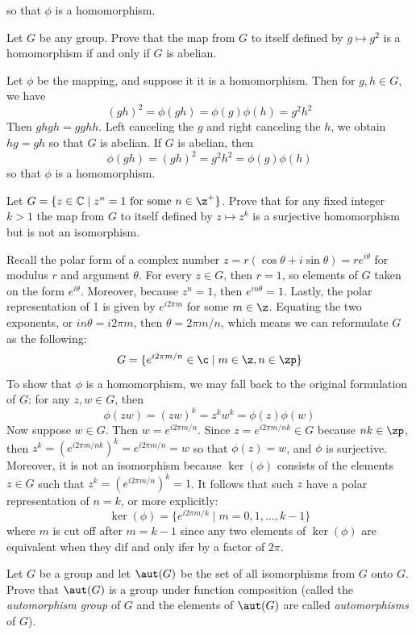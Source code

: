 \begin{problems}
\begin{sol}
        so that $\phi$ is a homomorphism.
    \end{sol}
    \item Let $G$ be any group. Prove that the map from $G$ to itself defined by $g \mapsto g^2$ is a homomorphism if and only if $G$ is abelian.
    \begin{sol}
        Let $\phi$ be the mapping, and suppose it it is a homomorphism. Then for $g, h \in G$, we have
        \[(gh)^2 = \phi(gh) = \phi(g)\phi(h) = g^2h^2\]
        Then $ghgh = gghh$. Left canceling the $g$ and right canceling the $h$, we obtain $hg = gh$ so that $G$ is abelian. If $G$ is abelian, then
        \[\phi(gh) = (gh)^2 = g^2h^2 = \phi(g)\phi(h)\]
        so that $\phi$ is a homomorphism.
    \end{sol}
    \item Let $G = \{ z \in \mathbb{C} \mid z^n = 1 \text{ for some } n \in \z^+ \}$. Prove that for any fixed integer $k > 1$ the map from $G$ to itself defined by $z \mapsto z^k$ is a surjective homomorphism but is not an isomorphism.
    \begin{sol}
        Recall the polar form of a complex number $z = r(\cos\theta + i\sin\theta) = re^{i\theta}$ for modulus $r$ and argument $\theta$. For every $z \in G$, then $r = 1$, so elements of $G$ taken on the form $e^{i\theta}$. Moreover, because $z^n = 1$, then $e^{in\theta} = 1$. Lastly, the polar representation of 1 is given by $e^{i2\pi m}$ for some $m \in \z$. Equating the two exponents, or $in\theta = i2\pi m$, then $\theta = 2\pi m/n$, which means we can reformulate $G$ as the following:
        \[G = \{e^{i2\pi m/n} \in \c \mid m \in \z, n \in \zp\}\]
        To show that $\phi$ is a homomorphism, we may fall back to the original formulation of $G$: for any $z, w \in G$, then
        \[\phi(zw) = (zw)^k = z^kw^k = \phi(z)\phi(w)\]
        Now suppose $w \in G$. Then $w = e^{i2\pi m/n}$. Since $z = e^{i2\pi m/nk} \in G$ because $nk \in \zp$, then $z^k = (e^{i2\pi m/nk})^k = e^{i2\pi m/n} = w$ so that $\phi(z) = w$, and $\phi$ is surjective. Moreover, it is not an isomorphism because $\ker(\phi)$ consists of the elements $z \in G$ such that $z^k = (e^{i2\pi m/n})^k = 1$. It follows that such $z$ have a polar representation of $n = k$, or more explicitly:
        \[\ker(\phi) = \{e^{i2\pi m/k} \mid m = 0, 1, \ldots, k - 1\}\]
        where $m$ is cut off after $m = k - 1$ since any two elements of $\ker(\phi)$ are equivalent when they dif and only ifer by a factor of $2\pi$.
    \end{sol}
    \item Let $G$ be a group and let $\aut(G)$ be the set of all isomorphisms from $G$ onto $G$. Prove that $\aut(G)$ is a group under function composition (called the \emph{automorphism group} of $G$ and the elements of $\aut(G)$ are called \emph{automorphisms} of $G$).

\end{problems}
